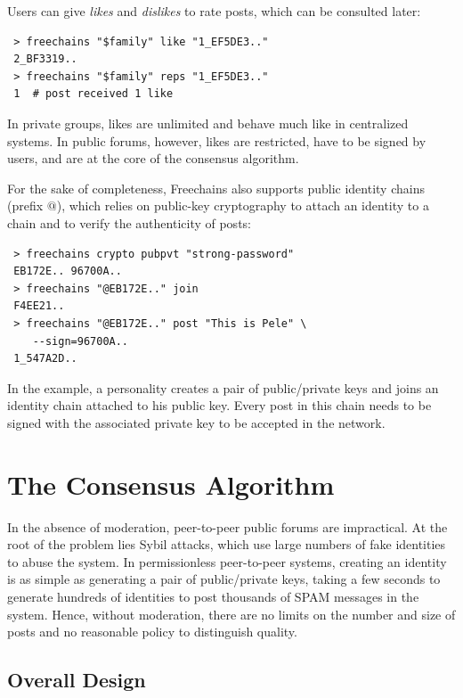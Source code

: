 \documentclass[10pt,journal,compsoc]{IEEEtran}
\newcommand{\FC}   {Freechains\xspace}
\begin{document}
Users can give \emph{likes} and \emph{dislikes} to rate posts, which can be
consulted later:

{\footnotesize
\begin{verbatim}
 > freechains "$family" like "1_EF5DE3.."
 2_BF3319..
 > freechains "$family" reps "1_EF5DE3.."
 1  # post received 1 like
\end{verbatim}
}

In private groups, likes are unlimited and behave much like in centralized
systems.
In public forums, however, likes are restricted, have to be signed by users,
and are at the core of the consensus algorithm.

For the sake of completeness, \FC also supports public identity chains (prefix
$@$), which relies on public-key cryptography to attach an identity to a chain
and to verify the authenticity of posts:

{\footnotesize
\begin{verbatim}
 > freechains crypto pubpvt "strong-password"
 EB172E.. 96700A..
 > freechains "@EB172E.." join
 F4EE21..
 > freechains "@EB172E.." post "This is Pele" \
    --sign=96700A..
 1_547A2D..
\end{verbatim}
}

In the example, a personality creates a pair of public/private keys and joins
an identity chain attached to his public key.
Every post in this chain needs to be signed with the associated private key to
be accepted in the network.

\section{The Consensus Algorithm}
\label{sec.consensus}

In the absence of moderation, peer-to-peer public forums are impractical.
At the root of the problem lies Sybil attacks, which use large numbers of fake
identities to abuse the system.
In permissionless peer-to-peer systems, creating an identity is as simple as
generating a pair of public/private keys, taking a few seconds to generate
hundreds of identities to post thousands of SPAM messages in the system.
Hence, without moderation, there are no limits on the number and size of posts
and no reasonable policy to distinguish quality.

\subsection{Overall Design}
\end{document}
